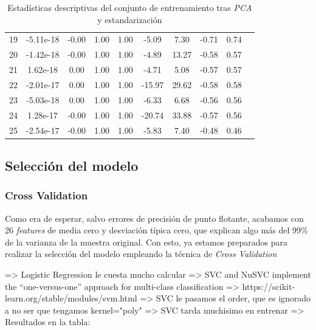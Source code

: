 \documentclass[11pt]{article}
\begin{document}
\begin{table}[H]
\begin{tabular}{|c|c|c|c|c|c|c|c|c|c|}
19              &-5.11e-18 &-0.00  &1.00  &1.00 & -5.09 &  7.30 &-0.71  &0.74 \\
20              &-1.42e-18 &-0.00  &1.00  &1.00 & -4.89 & 13.27 &-0.58  &0.57 \\
21              & 1.62e-18 & 0.00  &1.00  &1.00 & -4.71 &  5.08 &-0.57  &0.57 \\
22              &-2.01e-17 & 0.00  &1.00  &1.00 &-15.97 & 29.62 &-0.58  &0.58 \\
23              &-5.03e-18 & 0.00  &1.00  &1.00 & -6.33 &  6.68 &-0.56  &0.56 \\
24              & 1.28e-17 &-0.00  &1.00  &1.00 &-20.74 & 33.88 &-0.57  &0.56 \\
25              &-2.54e-17 &-0.00  &1.00  &1.00 & -5.83 &  7.40 &-0.48  &0.46 \\
\hline
\end{tabular}
    \caption{Estadísticas descriptivas del conjunto de entrenamiento tras \emph{PCA} y estandarización}
\end{table}

\pagebreak
\subsection{Selección del modelo}
\subsubsection{Cross Validation}

Como era de esperar, salvo errores de precisión de punto flotante, acabamos con 26 \emph{features} de media cero y desviación típica cero, que explican algo más del 99\% de la varianza de la muestra original. Con esto, ya estamos preparados para realizar la selección del modelo empleando la técnica de \emph{Cross Validation}




=> Logistic Regression le cuesta mucho calcular
=> SVC and NuSVC implement the “one-versus-one” approach for multi-class classification => https://scikit-learn.org/stable/modules/svm.html
=> SVC le pasamos el order, que es ignorado a no ser que tengamos kernel="poly"
=> SVC tarda muchisimo en entrenar
=> Resultados en la tabla:
\end{document}

